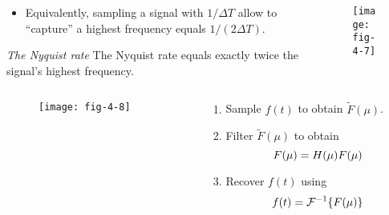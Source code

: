 
\begin{frame}
\begin{columns}
\begin{column}{.5\textwidth}
\begin{itemize}
\item Equivalently, sampling a signal with $1/\Delta T$ allow to ``capture'' a highest frequency equals $1/(2\Delta T)$.
\end{itemize}
\begin{block}{\textit{The Nyquist rate}}
The Nyquist rate equals exactly twice the signal's highest frequency.
\end{block}
\end{column}
\begin{column}{.5\textwidth}
\begin{figure}
\centering
\texttt{[image: fig-4-7]}
\end{figure}
\end{column}
\end{columns}
\end{frame}


\begin{frame}
\begin{columns}
\begin{column}{.6\textwidth}
\begin{figure}
\centering
\texttt{[image: fig-4-8]}
\end{figure}
\end{column}
\begin{column}{.4\textwidth}
\begin{enumerate}
\item Sample $f(t)$ to obtain $\tilde{F}(\mu)$.
\item Filter $\tilde{F}(\mu)$ to obtain
\begin{equation}
F(\mu) = H(\mu)F(\mu)\notag
\end{equation}
\item Recover $f(t)$ using
\begin{equation}
f(t) = \mathcal{F}^{-1}\{F(\mu)\}\notag
\end{equation}
\end{enumerate}
\end{column}
\end{columns}
\end{frame}

